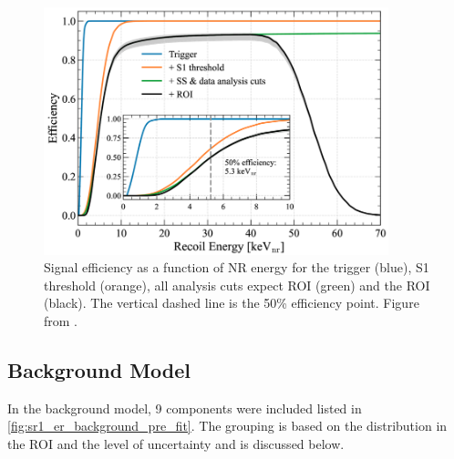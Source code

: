 

\begin{figure}
    \centering
    \includegraphics[width=10cm]{Figures/EFT/All_SR1_Plots/NR_efficiency.png}
    \caption{Signal efficiency as a function of NR energy for the trigger (blue), S1 threshold (orange), all analysis cuts expect ROI (green) and the ROI (black).
    The vertical dashed line is the 50\% efficiency point. Figure from \cite{lz_ws_sr1_ref}.
    }
    \label{fig:sr1_nr_efficiency}
\end{figure}

%


\subsection{Background Model}
\par
In the background model, 9 components were included listed in \autoref{fig:sr1_er_background_pre_fit}.
The grouping is based on the distribution in the ROI and the level of uncertainty and is discussed below.

